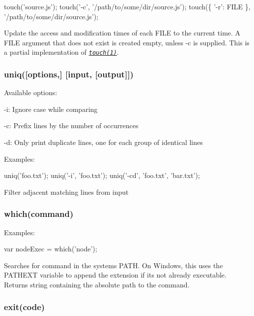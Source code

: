 \begin{DoxyCode}
touch('source.js');
touch('-c', '/path/to/some/dir/source.js');
touch(\{ '-r': FILE \}, '/path/to/some/dir/source.js');
\end{DoxyCode}


Update the access and modification times of each F\+I\+LE to the current time. A F\+I\+LE argument that does not exist is created empty, unless -\/c is supplied. This is a partial implementation of {\itshape \href{http://linux.die.net/man/1/touch}{\tt touch(1)}}.

\subsubsection*{uniq(\mbox{[}options,\mbox{]} \mbox{[}input, \mbox{[}output\mbox{]}\mbox{]})}

Available options\+:


\begin{DoxyItemize}
\item {\ttfamily -\/i}\+: Ignore case while comparing
\item {\ttfamily -\/c}\+: Prefix lines by the number of occurrences
\item {\ttfamily -\/d}\+: Only print duplicate lines, one for each group of identical lines
\end{DoxyItemize}

Examples\+:


\begin{DoxyCode}
uniq('foo.txt');
uniq('-i', 'foo.txt');
uniq('-cd', 'foo.txt', 'bar.txt');
\end{DoxyCode}


Filter adjacent matching lines from input

\subsubsection*{which(command)}

Examples\+:


\begin{DoxyCode}
var nodeExec = which('node');
\end{DoxyCode}


Searches for {\ttfamily command} in the system\textquotesingle{}s P\+A\+TH. On Windows, this uses the {\ttfamily P\+A\+T\+H\+E\+XT} variable to append the extension if it\textquotesingle{}s not already executable. Returns string containing the absolute path to the command.

\subsubsection*{exit(code)}

